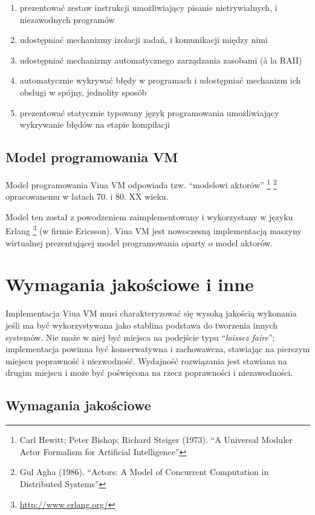 \documentclass[11pt,oneside,a4paper,titlepage,onecolumn]{article}
\begin{document}
\begin{enumerate}
    \item prezentować zestaw instrukcji umożliwiający pisanie nietrywialnych, i niezawodnych programów
    \item udostępniać mechanizmy izolacji zadań, i komunikacji między nimi
    \item udostępniać mechanizmy automatycznego zarządzania zasobami (à la RAII)
    \item automatycznie wykrywać błędy w programach i udostępniać mechanizm ich obsługi w spójny, jednolity
        sposób
    \item prezentować statycznie typowany język programowania umożliwiający wykrywanie błędów na etapie
        kompilacji
\end{enumerate}

\subsection{Model programowania VM}

Model programowania Viua VM odpowiada tzw. ``modelowi aktorów''
\footnote{Carl Hewitt; Peter Bishop; Richard Steiger (1973). ``A Universal Moduler Actor Formalism for
Artificial Intelligence''}
\footnote{Gul Agha (1986). ``Actors: A Model of Concurrent Computation in Distributed Systems''}
opracowanemu w latach 70. i 80. XX wieku.

Model ten został z powodzeniem zaimplementowany i wykorzystany w języku Erlang
\footnote{\url{http://www.erlang.org/}} (w firmie Ericsson).
Viua VM jest nowoczesną implementacją maszyny wirtualnej prezentującej model programowania oparty o model
aktorów.

\section{Wymagania jakościowe i inne}

Implementacja Viua VM musi charakteryzować się wysoką jakością wykonania jeśli ma być wykorzystywana jako
stablina podstawa do tworzenia innych systemów. Nie może w niej być miejsca na podejście typu
``\emph{laissez faire}''; implementacja powinna być konserwatywna i zachowawcza, stawiając na pierszym miejscu
poprawność i niezwodność. Wydajność rozwiązania jest stawiana na drugim miejscu i może być poświęcona na rzecz
poprawności i niezawodności.

\subsection{Wymagania jakościowe}
\end{document}
